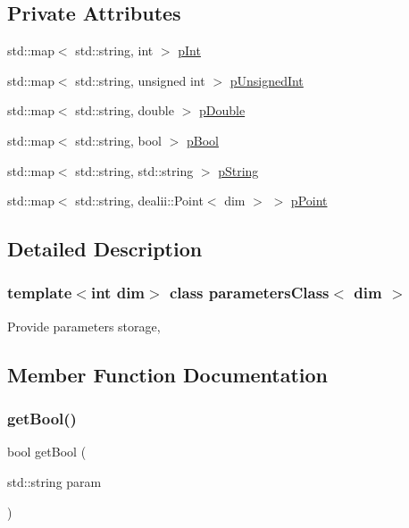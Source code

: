 \subsection*{Private Attributes}
\begin{DoxyCompactItemize}
\item 
std\+::map$<$ std\+::string, int $>$ \mbox{\hyperlink{classparameters_class_ac8ac4bc08d6cb6aed011bb1d0fc1203f}{p\+Int}}
\item 
std\+::map$<$ std\+::string, unsigned int $>$ \mbox{\hyperlink{classparameters_class_a997bcb31fee3242f776c7e05d709ce12}{p\+Unsigned\+Int}}
\item 
std\+::map$<$ std\+::string, double $>$ \mbox{\hyperlink{classparameters_class_a1e0e610c04bda534bcd48bb81ad75ffc}{p\+Double}}
\item 
std\+::map$<$ std\+::string, bool $>$ \mbox{\hyperlink{classparameters_class_abb7d3139bc101537c7f85fedfe94da2f}{p\+Bool}}
\item 
std\+::map$<$ std\+::string, std\+::string $>$ \mbox{\hyperlink{classparameters_class_a3453601308e73bcc0f45ed6ea8a9959b}{p\+String}}
\item 
std\+::map$<$ std\+::string, dealii\+::\+Point$<$ dim $>$ $>$ \mbox{\hyperlink{classparameters_class_a619a83b172e412339a12ea402580662c}{p\+Point}}
\end{DoxyCompactItemize}


\subsection{Detailed Description}
\subsubsection*{template$<$int dim$>$\newline
class parameters\+Class$<$ dim $>$}

Provide parameters storage, 

\subsection{Member Function Documentation}
\mbox{\label{classparameters_class_a7c4393bb42319d396ddf38c2464c7062}} 
\subsubsection{\texorpdfstring{get\+Bool()}{getBool()}}
{\footnotesize\ttfamily bool get\+Bool (\begin{DoxyParamCaption}\item[{std\+::string}]{param }\end{DoxyParamCaption})}

